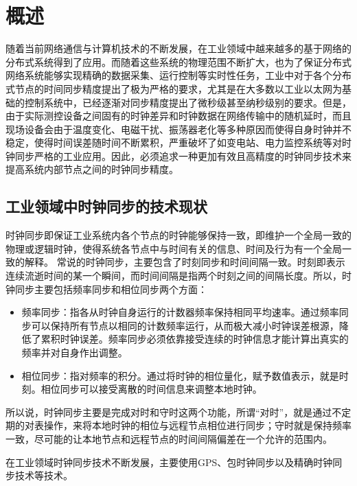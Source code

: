 
\chapter{概述}
\label{chap:intro}
随着当前网络通信与计算机技术的不断发展，在工业领域中越来越多的基于网络的分布式系统得到了应用。而随着这些系统的物理范围不断扩大，也为了保证分布式网络系统能够实现精确的数据采集、运行控制等实时性任务，工业中对于各个分布式节点的时间同步精度提出了极为严格的要求，尤其是在大多数以工业以太网为基础的控制系统中，已经逐渐对同步精度提出了微秒级甚至纳秒级别的要求。但是，由于实际测控设备之间固有的时钟差异和时钟数据在网络传输中的随机延时，而且现场设备会由于温度变化、电磁干扰、振荡器老化等多种原因而使得自身时钟并不稳定，使得时间误差随时间不断累积，严重破坏了如变电站、电力监控系统等对时钟同步严格的工业应用。因此，必须追求一种更加有效且高精度的时钟同步技术来提高系统内部节点之间的时钟同步精度。

\section{工业领域中时钟同步的技术现状}
时钟同步即保证工业系统内各个节点的时钟能够保持一致，即维护一个全局一致的物理或逻辑时钟，使得系统各节点中与时间有关的信息、时间及行为有一个全局一致的解释\supercite{1}。
常说的时钟同步，主要包含了时刻同步和时间间隔一致。时刻即表示连续流逝时间的某一个瞬间，而时间间隔是指两个时刻之间的间隔长度。所以，时钟同步主要包括频率同步和相位同步两个方面：
\begin{itemize}[noitemsep,topsep=0pt,parsep=0pt,partopsep=0pt]
	\item 频率同步：指各从时钟自身运行的计数器频率保持相同平均速率。通过频率同步可以保持所有节点以相同的计数频率运行，从而极大减小时钟误差根源，降低了累积时钟误差。频率同步必须依靠接受连续的时钟信息才能计算出真实的频率并对自身作出调整。
	\item 相位同步：指对频率的积分。通过将时钟的相位量化，赋予数值表示，就是时刻。相位同步可以接受离散的时间信息来调整本地时钟。
\end{itemize}
所以说，时钟同步主要是完成对时和守时这两个功能，所谓“对时”，就是通过不定期的对表操作，来将本地时钟的相位与远程节点相位进行同步；守时就是保持频率一致，尽可能的让本地节点和远程节点的时间间隔偏差在一个允许的范围内。

在工业领域时钟同步技术不断发展，主要使用GPS、包时钟同步以及精确时钟同步技术等技术。

